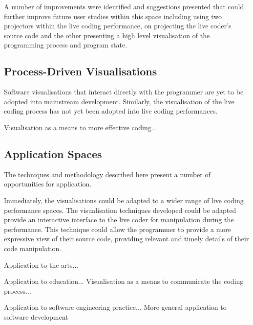 A number of improvements were identified and suggestions presented that could further improve future user studies within this space including using two projectors within the live coding performance, on projecting the live coder's source code and the other presenting a high level visualisation of the programming process and program state.

\subsection{Process-Driven Visualisations}

Software visualisations that interact directly with the programmer are yet to be adopted into mainstream development. Similarly, the visualisation of the live coding process has not yet been adopted into live coding performances.


Visualisation as a means to more effective coding...

\subsection{Application Spaces}

The techniques and methodology described here present a number of opportunities for application.

Immediately, the visualisations could be adapted to a wider range of live coding performance spaces. The visualisation techniques developed could be adapted provide an interactive interface to the live coder for manipulation during the performance. This technique could allow the programmer to provide a more expressive view of their source code, providing relevant and timely details of their code manipulation. 

Application to the arts...

Application to education...
Visualisation as a means to communicate the coding process...

Application to software engineering practice...
More general application to software development


